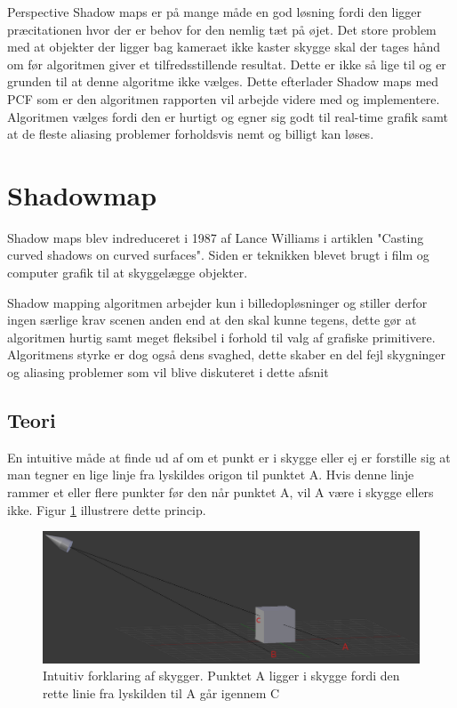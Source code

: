 \documentclass[11pt,a4paper]{article}
\begin{document}
Perspective Shadow maps er på mange måde en god løsning fordi den ligger præcitationen hvor der er behov for den nemlig tæt på øjet. Det store problem med at objekter der ligger bag kameraet ikke kaster skygge skal der tages hånd om før algoritmen giver et tilfredsstillende resultat. Dette er ikke så lige til og er grunden til at denne algoritme ikke vælges. Dette efterlader Shadow maps med PCF som er den algoritmen rapporten vil arbejde videre med og implementere. Algoritmen vælges fordi den er hurtigt og egner sig godt til real-time grafik samt at de fleste aliasing problemer forholdsvis nemt og billigt kan løses.



\newpage 
\section{Shadowmap}

Shadow maps blev indreduceret i 1987 af Lance Williams i artiklen "Casting curved shadows on curved surfaces". Siden er teknikken blevet brugt i film og computer grafik til at skyggelægge objekter.

Shadow mapping algoritmen arbejder kun i billedopløsninger og stiller derfor ingen særlige krav scenen anden end at den skal kunne tegens, dette gør at algoritmen hurtig samt meget fleksibel i forhold til valg af grafiske primitivere. Algoritmens styrke er dog også dens svaghed, dette skaber en del fejl skygninger og aliasing problemer som vil blive diskuteret i dette afsnit


\subsection{Teori}

En intuitive måde at finde ud af om et punkt er i skygge eller ej er forstille sig at man tegner en lige linje fra lyskildes origon til punktet A. Hvis denne linje rammer et eller flere punkter før den når punktet A, vil A være i  skygge ellers ikke. Figur \ref{shadowdesc} illustrere dette princip.

\begin{figure}[ht!]
\centering
\includegraphics[width=120mm]{img/1.png}
\caption{Intuitiv forklaring af skygger. Punktet A ligger i skygge fordi den rette linie fra lyskilden til A går igennem C}
\label{shadowdesc}
\end{figure}
\end{document}
